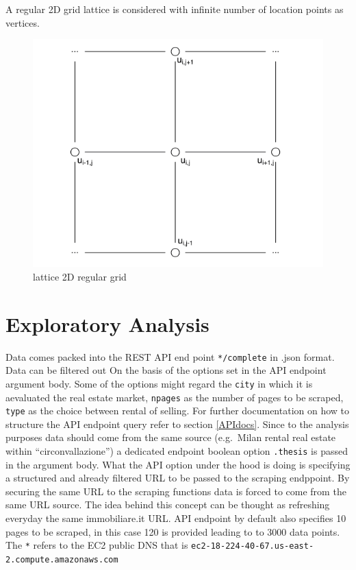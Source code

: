 \documentclass[
  12pt,
  a4paper,
  oneside]{book}
\begin{document}
A regular 2D grid lattice is considered with infinite number of location points as vertices.

\begin{figure}
\centering
\includegraphics{images/lattice.png}
\caption{lattice 2D regular grid}
\end{figure}

\hypertarget{exploratory}{%
\chapter{Exploratory Analysis}\label{exploratory}}

Data comes packed into the REST API end point \texttt{*/complete} in .json format. Data can be filtered out On the basis of the options set in the API endpoint argument body. Some of the options might regard the \texttt{city} in which it is aevaluated the real estate market, \texttt{npages} as the number of pages to be scraped, \texttt{type} as the choice between rental of selling. For further documentation on how to structure the API endpoint query refer to section \ref{APIdocs}. Since to the analysis purposes data should come from the same source (e.g.~Milan rental real estate within ``circonvallazione'') a dedicated endpoint boolean option \texttt{.thesis} is passed in the argument body. What the API option under the hood is doing is specifying a structured and already filtered URL to be passed to the scraping endppoint. By securing the same URL to the scraping functions data is forced to come from the same URL source. The idea behind this concept can be thought as refreshing everyday the same immobiliare.it URL. API endpoint by default also specifies 10 pages to be scraped, in this case 120 is provided leading to to 3000 data points. The \texttt{*} refers to the EC2 public DNS that is \texttt{ec2-18-224-40-67.us-east-2.compute.amazonaws.com}
\end{document}
